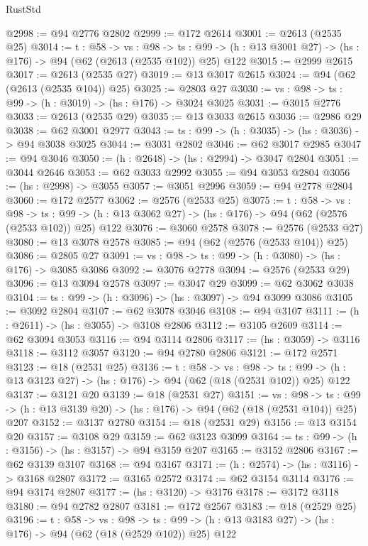 \begin{lexlean}{RustStd}
\begin{coremodule}
@2998 := @94 @2776 @2802
@2999 := @172 @2614
@3001 := @2613 (@2535 @25)
@3014 := {t : @58} ->
  {vs : @98} ->
  {ts : @99} -> (h : @13 @3001 @27) -> (hs : @176) -> @94 (@62 (@2613 (@2535 @102)) @25) @122
@3015 := @2999 @2615
@3017 := @2613 (@2535 @27)
@3019 := @13 @3017 @2615
@3024 := @94 (@62 (@2613 (@2535 @104)) @25)
@3025 := @2803 @27
@3030 := {vs : @98} -> {ts : @99} -> (h : @3019) -> (hs : @176) -> @3024 @3025
@3031 := @3015 @2776
@3033 := @2613 (@2535 @29)
@3035 := @13 @3033 @2615
@3036 := @2986 @29
@3038 := @62 @3001 @2977
@3043 := {ts : @99} -> (h : @3035) -> (hs : @3036) -> @94 @3038 @3025
@3044 := @3031 @2802
@3046 := @62 @3017 @2985
@3047 := @94 @3046
@3050 := (h : @2648) -> (hs : @2994) -> @3047 @2804
@3051 := @3044 @2646
@3053 := @62 @3033 @2992
@3055 := @94 @3053 @2804
@3056 := (hs : @2998) -> @3055
@3057 := @3051 @2996
@3059 := @94 @2778 @2804
@3060 := @172 @2577
@3062 := @2576 (@2533 @25)
@3075 := {t : @58} ->
  {vs : @98} ->
  {ts : @99} -> (h : @13 @3062 @27) -> (hs : @176) -> @94 (@62 (@2576 (@2533 @102)) @25) @122
@3076 := @3060 @2578
@3078 := @2576 (@2533 @27)
@3080 := @13 @3078 @2578
@3085 := @94 (@62 (@2576 (@2533 @104)) @25)
@3086 := @2805 @27
@3091 := {vs : @98} -> {ts : @99} -> (h : @3080) -> (hs : @176) -> @3085 @3086
@3092 := @3076 @2778
@3094 := @2576 (@2533 @29)
@3096 := @13 @3094 @2578
@3097 := @3047 @29
@3099 := @62 @3062 @3038
@3104 := {ts : @99} -> (h : @3096) -> (hs : @3097) -> @94 @3099 @3086
@3105 := @3092 @2804
@3107 := @62 @3078 @3046
@3108 := @94 @3107
@3111 := (h : @2611) -> (hs : @3055) -> @3108 @2806
@3112 := @3105 @2609
@3114 := @62 @3094 @3053
@3116 := @94 @3114 @2806
@3117 := (hs : @3059) -> @3116
@3118 := @3112 @3057
@3120 := @94 @2780 @2806
@3121 := @172 @2571
@3123 := @18 (@2531 @25)
@3136 := {t : @58} ->
  {vs : @98} ->
  {ts : @99} -> (h : @13 @3123 @27) -> (hs : @176) -> @94 (@62 (@18 (@2531 @102)) @25) @122
@3137 := @3121 @20
@3139 := @18 (@2531 @27)
@3151 := {vs : @98} ->
  {ts : @99} -> (h : @13 @3139 @20) -> (hs : @176) -> @94 (@62 (@18 (@2531 @104)) @25) @207
@3152 := @3137 @2780
@3154 := @18 (@2531 @29)
@3156 := @13 @3154 @20
@3157 := @3108 @29
@3159 := @62 @3123 @3099
@3164 := {ts : @99} -> (h : @3156) -> (hs : @3157) -> @94 @3159 @207
@3165 := @3152 @2806
@3167 := @62 @3139 @3107
@3168 := @94 @3167
@3171 := (h : @2574) -> (hs : @3116) -> @3168 @2807
@3172 := @3165 @2572
@3174 := @62 @3154 @3114
@3176 := @94 @3174 @2807
@3177 := (hs : @3120) -> @3176
@3178 := @3172 @3118
@3180 := @94 @2782 @2807
@3181 := @172 @2567
@3183 := @18 (@2529 @25)
@3196 := {t : @58} ->
  {vs : @98} ->
  {ts : @99} -> (h : @13 @3183 @27) -> (hs : @176) -> @94 (@62 (@18 (@2529 @102)) @25) @122

\end{coremodule}
\end{lexlean}
